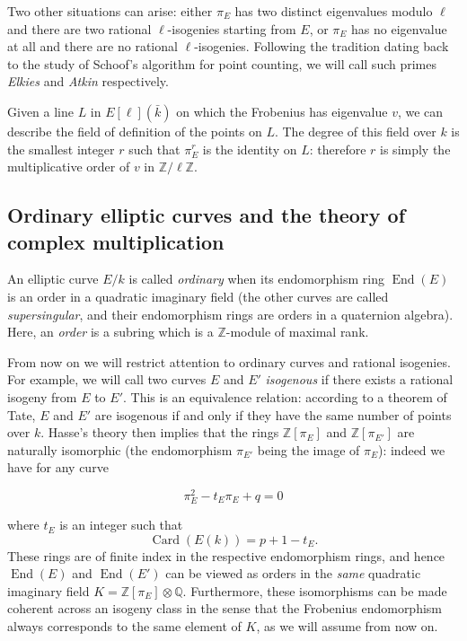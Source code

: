 \documentclass{article}
\newcommand{\Q}{\mathbb{Q}}
\newcommand{\Z}{\mathbb{Z}}
\theoremstyle{definition}
\DeclareMathOperator{\End}{End}
\DeclareMathOperator{\Card}{Card}
\begin{document}
Two other situations can arise: either $\pi_E$ has two distinct eigenvalues 
modulo $\ell$ and there are two rational $\ell$-isogenies starting from $E$, or 
$\pi_E$ has no eigenvalue at all and there are no rational $\ell$-isogenies. 
Following the tradition dating back to the study of Schoof's algorithm for 
point counting, we will call such primes \emph{Elkies} and \emph{Atkin} 
respectively.

Given a line $L$ in $E[\ell](\bar{k})$ on which the Frobenius has eigenvalue $v$,
we can describe the field of definition of the points on $L$. The degree of this
field over $k$ is the smallest integer $r$ such that $\pi_E^r$ is the identity
on $L$: therefore $r$ is simply the multiplicative order of $v$ in $\Z/\ell\Z$.



\subsection{Ordinary elliptic curves and the theory of complex multiplication}

An elliptic curve $E/k$ is called \emph{ordinary} when its endomorphism ring $
\End(E)$ is an order in a quadratic imaginary field (the other curves are called 
\emph{supersingular}, and their endomorphism rings are orders in a quaternion 
algebra). Here, an \emph{order} is a subring which is a $\Z$-module of maximal 
rank. 

From now on we will restrict attention to ordinary curves and rational 
isogenies. For example, we will call two curves $E$ and $E'$ \emph{isogenous} 
if there exists a rational isogeny from $E$ to $E'$. This is an equivalence 
relation: according to a theorem of Tate, $E$ and $E'$ are isogenous if and 
only if they have the same number of points over $k$. Hasse's theory then 
implies that the rings $\Z[\pi_E]$ and $\Z[\pi_{E'}]$ are naturally isomorphic 
(the endomorphism
$\pi_{E'}$ being the image of $\pi_{E}$): indeed we have for any curve

\begin{equation}
\label{charfrob}
\pi_E^2 - t_E\pi_E+ q = 0
\end{equation}

where $t_E$ is an integer such that
\[
\Card(E(k)) = p + 1 - t_E.
\]
These rings are of finite index in the respective endomorphism rings,
and hence
$\End(E)$ and $\End(E')$ can be viewed as orders in the \emph{same} quadratic 
imaginary field $K = \Z[\pi_E]\otimes\Q$. Furthermore, these isomorphisms can 
be made coherent across an isogeny class in the sense that the Frobenius 
endomorphism always corresponds to the same element of $K$, as we will assume
from now on.
\end{document}
